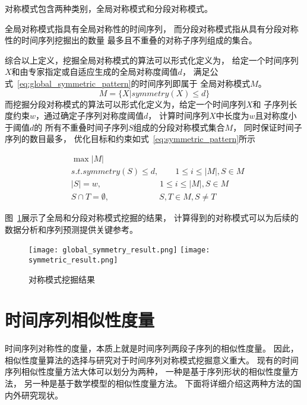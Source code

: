 \begin{definition}
  对称模式包含两种类别，全局对称模式和分段对称模式。

  全局对称模式指具有全局对称性的时间序列，
  而分段对称模式指从具有分段对称性的时间序列挖掘出的数量
  最多且不重叠的对称子序列组成的集合\cite{2022968}。 
  
\end{definition}

综合以上定义，挖掘全局对称模式的算法可以形式化定义为，
给定一个时间序列$X$和由专家指定或自适应生成的全局对称度阈值$d$，
满足公式~\ref{eq:global_symmetric_pattern}的时间序列即属于
全局对称模式$M$。
\begin{equation}
  M = \{X | symmetry(X) \leq d\}
  \label{eq:global_symmetric_pattern}
\end{equation}
而挖掘分段对称模式的算法可以形式化定义为，给定一个时间序列$X$和
子序列长度约束$w$，通过确定子序列对称度阈值$d$，
计算时间序列$X$中长度为$w$且对称度小于阈值$d$的
所有不重叠时间子序列$S$组成的分段对称模式集合$M$，
同时保证时间子序列的数目最多，
优化目标和约束如式~\ref{eq:symmetric_pattern}所示

\begin{equation}
  \begin{split}
    & \max \left| M \right| \\
    & s.t. symmetry \left( S \right) \leq d, \qquad 1 \leq i \leq \left| M \right|,S \in M \\
    & \left| S \right| = w, \qquad \qquad \qquad \quad 1 \leq i \leq \left| M \right|,S \in M \\
    & S \cap T = \emptyset, \qquad \qquad \qquad S,T \in M,S \neq T
  \end{split}
  \label{eq:symmetric_pattern}
\end{equation}

图~\ref{fig:symmetric_result}展示了全局和分段对称模式挖掘的结果，
计算得到的对称模式可以为后续的数据分析和序列预测提供关键参考。
\begin{figure}
  \centering
    {\texttt{[image: global\_symmetry\_result.png]}}
    {\texttt{[image: symmetric\_result.png]}}
  \caption{对称模式挖掘结果}
  \label{fig:symmetric_result}
\end{figure}

\section{时间序列相似性度量}
时间序列对称性的度量，本质上就是时间序列两段子序列的相似性度量。
因此，相似性度量算法的选择与研究对于时间序列对称模式挖掘意义重大。
现有的时间序列相似性度量方法大体可以划分为两种\cite{DBLP:journals/vldb/SuLZZZ20}，
一种是基于序列形状的相似性度量方法，
另一种是基于数学模型的相似性度量方法。
下面将详细介绍这两种方法的国内外研究现状。

